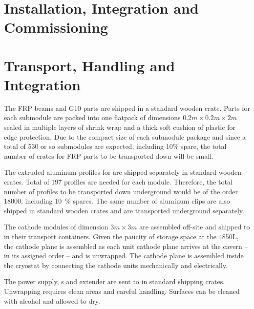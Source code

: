 \section{Installation, Integration and Commissioning}
\label{sec:fddp-hv-install}
\section{Transport, Handling and Integration}
\label{sec:fddp-hv-install-transport}


The  FRP beams and G10 parts are shipped in a standard wooden crate.  Parts for each submodule are packed into one %
flatpack of dimensions $0.2m\times 0.2m\times 2m$ sealed in multiple layers of shrink wrap and a thick soft cushion of plastic for edge protection.   Due to the compact size of each submodule package and since a total of 530 or so submodules are expected, including 10\% spare, the total number of crates for FRP parts to be transported down will be small.

The extruded aluminum profiles for  are shipped separately in  standard wooden crates.  Total of \num{197} profiles are needed for each \tpcheight module. Therefore, the total number of profiles to be transported down underground would be of the order \num{18000}, including \SI{10}{\%} spares.  The same number of aluminum clips are also shipped in standard wooden crates and are transported underground separately. 


The cathode modules of dimension $3m\times3m$ are assembled off-site and shipped to \surf in their transport containers. Given the paucity of storage space at the 4850L, the cathode plane is assembled as each unit cathode plane arrives at the cavern -- in its assigned order -- and is unwrapped. The cathode plane is assembled inside the cryostat by connecting the cathode units mechanically and electrically. 


The power supply, \fdth{}s and  extender are sent to \surf in standard shipping crates. Unwrapping requires clean areas and careful handling. Surfaces can be cleaned with alcohol and allowed to dry.


